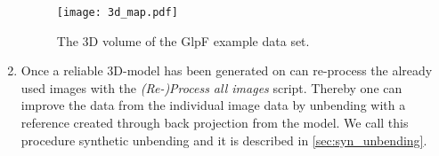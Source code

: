 \begin{enumerate}
	\begin{figure}[H]
		\centering
		\texttt{[image: 3d\_map.pdf]}
		\caption{The 3D volume of the GlpF example data set.}
		\label{fig:3d_map}
	\end{figure}
	\item Once a reliable 3D-model has been generated on can re-process the already used images with the \textit{(Re-)Process all images} script. Thereby one can improve the data from the individual image data by unbending with a reference created through back projection from the model. We call this procedure synthetic unbending and it is described in \autoref{sec:syn_unbending}.
	
\end{enumerate}


